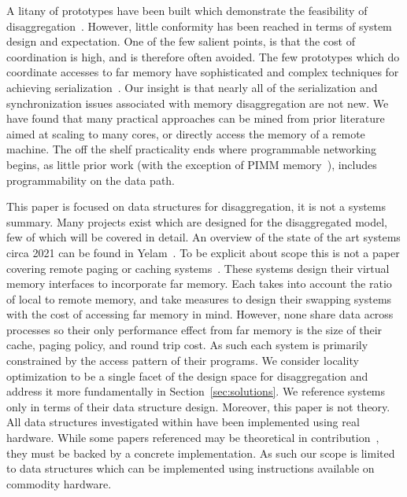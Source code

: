 
A litany of prototypes have been built which demonstrate the feasibility of
disaggregation~\cite{infiniswap,fastswap,leap,legoos,aifm,kona,reigons,software-far,lite,semeru}.
However, little conformity has been reached in terms of system design and
expectation. One of the few salient points, is that the cost of coordination is
high, and is therefore often avoided. The few prototypes which do coordinate
accesses to far memory have sophisticated and complex techniques for achieving
serialization~\cite{clover,one-sided-hash,sherman,ford}. Our insight is that
nearly all of the serialization and synchronization issues associated with
memory disaggregation are not new. We have found that many practical approaches
can be mined from prior literature aimed at scaling to many cores, or directly
access the memory of a remote machine. The off the shelf practicality ends where
programmable networking begins, as little prior work (with the exception of PIMM
memory~\cite{near-memory-structs}), includes programmability on the data path.

This paper is focused on data structures for disaggregation, it is not a systems
summary.  Many projects exist which are designed for the disaggregated model,
few of which will be covered in detail. An overview of the state of the art
systems circa 2021 can be found in Yelam~\cite{yelam2022systems}.
To be explicit about scope this is not a paper covering remote paging or caching
systems~\cite{fastswap,kona,infiniswap,leap,legoos}. These systems design their
virtual memory interfaces to incorporate far memory. Each takes into account the
ratio of local to remote memory, and take measures to design their swapping
systems with the cost of accessing far memory in mind.  However, none share data
across processes so their only performance effect from far memory is the size of
their cache, paging policy, and round trip cost. As such each system is
primarily constrained by the access pattern of their programs. We consider
locality optimization to be a single facet of the design space for
disaggregation and address it more fundamentally in
Section~\ref{sec:solutions}. We reference systems only in terms of their data
structure design.
Moreover, this paper is not theory. All data structures investigated within have been
implemented using real hardware. While some papers referenced may be theoretical
in contribution~\cite{flat-combine,hopscotch,linked-list-cas}, they must be
backed by a concrete implementation. As such our scope is limited to data
structures which can be implemented using instructions available on commodity
hardware.


